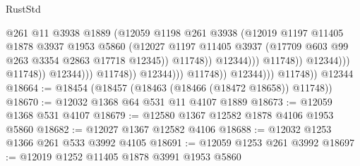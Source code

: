 \begin{lexlean}{RustStd}
\begin{coremodule}
                                                      @261
                                                      @11
                                                      @3938
                                                      @1889
                                                      (@12059
                                                        @1198
                                                        @261
                                                        @3938
                                                        (@12019
                                                          @1197
                                                          @11405
                                                          @1878
                                                          @3937
                                                          @1953
                                                          @5860
                                                          (@12027
                                                            @1197
                                                            @11405
                                                            @3937
                                                            (@17709
                                                              @603
                                                              @99
                                                              @263
                                                              @3354
                                                              @2863
                                                              @17718
                                                              @12345))
                                                          @11748))
                                                      @12344)))
                                                @11748))
                                            @12344)))
                                      @11748))
                                  @12344)))
                            @11748))
                        @12344)))
                  @11748))
              @12344)))
        @11748))
    @12344
@18664 := @18454 (@18457 (@18463 (@18466 (@18472 @18658)) @11748))
@18670 := @12032 @1368 @64 @531 @11 @4107 @1889
@18673 := @12059 @1368 @531 @4107
@18679 := @12580 @1367 @12582 @1878 @4106 @1953 @5860
@18682 := @12027 @1367 @12582 @4106
@18688 := @12032 @1253 @1366 @261 @533 @3992 @4105
@18691 := @12059 @1253 @261 @3992
@18697 := @12019 @1252 @11405 @1878 @3991 @1953 @5860

\end{coremodule}
\end{lexlean}
